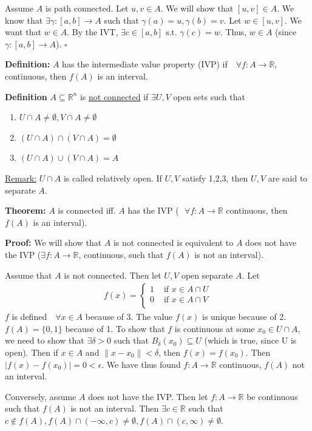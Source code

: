 \documentclass{article}
\newcommand*{\qed}{\hfill$\square$}%
\newcommand*{\txt}[1]{\text{ #1 }}%
\newcommand*{\fora}{\txt{}\forall}%
\newcommand*{\rr}{\mathbb{R}}%
\begin{document}
Assume $A$ is path connected. Let $u,v\in A$. We will show that $[u,v]\in A$. We know that $\exists \gamma:[a,b]\to A$ such that $\gamma(a)=u,\gamma(b)=v$. Let $w\in [u,v]$. We want that $w\in A$. By the IVT, $\exists c\in [a,b]\txt{s.t.}\gamma(c)=w$. Thus, $w\in A$ (since $\gamma:[a,b]\to A$). \qed

\textbf{Definition:} $A$ has the intermediate value property (IVP) if $\fora f:A\to \rr$, continuous, then $f(A)$ is an interval.

\textbf{Definition} $A\subseteq \rr^n$ is \underline{not connected} if $\exists U,V$ open sets such that \begin{enumerate}
    \item $U\cap A\neq \emptyset, V\cap A\neq \emptyset$
    \item $(U\cap A)\cap(V\cap A)=\emptyset$
    \item $(U\cap A)\cup(V\cap A)=A$
\end{enumerate}
\underline{Remark:} $U\cap A$ is called relatively open. If $U,V$ satisfy 1,2,3, then $U,V$ are said to separate $A$.

\textbf{Theorem:} $A$ is connected iff. $A$ has the IVP ($\fora f:A\to \rr$ continuous, then $f(A)$ is an interval).

\textbf{Proof:} We will show that $A$ is not connected is equivalent to $A$ does not have the IVP ($\exists f:A\to \rr$, continuous, such that $f(A)$ is not an interval).

Assume that $A$ is not connected. Then let $U,V$ open separate $A$. Let \begin{align*}
    f(x)=\begin{cases}
        1 & \txt{if}x\in A\cap U \\ 
        0 & \txt{if}x\in A\cap V \\
    \end{cases}
\end{align*}
$f$ is defined $\fora x\in A$ because of 3. The value $f(x)$ is unique because of 2. $f(A)=\{0,1\}$ because of 1. To show that $f$ is continuous at some $x_0\in U\cap A$, we need to show that $\exists \delta>0$ such that $B_\delta(x_0)\subseteq U$ (which is true, since U is open). Then if $x\in A$ and $\|x-x_0\|<\delta$, then $f(x)=f(x_0)$. Then $|f(x)-f(x_0)|=0<\epsilon$. We have thus found $f:A\to \rr$ continuous, $f(A)$ not an interval.

Conversely, assume $A$ does not have the IVP. Then let $f:A\to \rr$ be continuous such that $f(A)$ is not an interval. Then $\exists c\in \rr$ such that $c\notin f(A),f(A)\cap (-\infty,c) \neq \emptyset, f(A)\cap (c,\infty)\neq \emptyset$.
\end{document}
